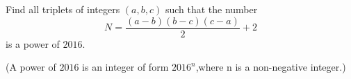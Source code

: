 Find all triplets of integers $(a,b,c)$ such that the number$$N = \frac{(a-b)(b-c)(c-a)}{2} + 2$$is a power of $2016$.

(A power of $2016$ is an integer of form $2016^n$,where n is a non-negative integer.)